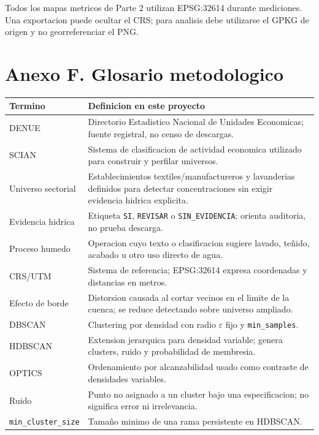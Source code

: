 \documentclass[11pt,letterpaper]{article}
\begin{document}
Todos los mapas metricos de Parte 2 utilizan EPSG:32614 durante mediciones. Una exportacion puede ocultar el CRS; para analisis debe utilizarse el GPKG de origen y no georreferenciar el PNG.

\section{Anexo F. Glosario metodologico}

\begin{longtable}{p{}p{}}
\toprule
\textbf{Termino} & \textbf{Definicion en este proyecto} \\
\midrule
DENUE & Directorio Estadistico Nacional de Unidades Economicas; fuente registral, no censo de descargas. \\
SCIAN & Sistema de clasificacion de actividad economica utilizado para construir y perfilar universos. \\
Universo sectorial & Establecimientos textiles/manufactureros y lavanderias definidos para detectar concentraciones sin exigir evidencia hidrica explicita. \\
Evidencia hidrica & Etiqueta \texttt{SI}, \texttt{REVISAR} o \texttt{SIN\_EVIDENCIA}; orienta auditoria, no prueba descarga. \\
Proceso humedo & Operacion cuyo texto o clasificacion sugiere lavado, teñido, acabado u otro uso directo de agua. \\
CRS/UTM & Sistema de referencia; EPSG:32614 expresa coordenadas y distancias en metros. \\
Efecto de borde & Distorsion causada al cortar vecinos en el limite de la cuenca; se reduce detectando sobre universo ampliado. \\
DBSCAN & Clustering por densidad con radio $\varepsilon$ fijo y \texttt{min\_samples}. \\
HDBSCAN & Extension jerarquica para densidad variable; genera clusters, ruido y probabilidad de membresia. \\
OPTICS & Ordenamiento por alcanzabilidad usado como contraste de densidades variables. \\
Ruido & Punto no asignado a un cluster bajo una especificacion; no significa error ni irrelevancia. \\
\texttt{min\_cluster\_size} & Tamaño minimo de una rama persistente en HDBSCAN. \\

\end{longtable}
\end{document}
